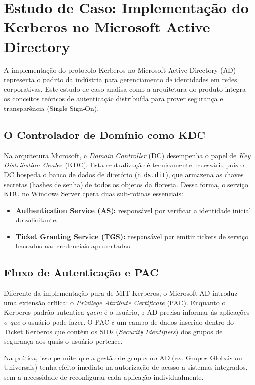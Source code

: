 \section{Estudo de Caso: Implementação do Kerberos no Microsoft Active Directory}
\label{sec:estudo_caso}

A implementação do protocolo Kerberos no Microsoft Active Directory (AD) representa o padrão da indústria para gerenciamento de identidades em redes corporativas. Este estudo de caso analisa como a arquitetura do produto integra os conceitos teóricos de autenticação distribuída para prover segurança e transparência (Single Sign-On).

\subsection{O Controlador de Domínio como KDC}
Na arquitetura Microsoft, o \textit{Domain Controller} (DC) desempenha o papel de \textit{Key Distribution Center} (KDC). Esta centralização é tecnicamente necessária pois o DC hospeda o banco de dados de diretório (\texttt{ntds.dit}), que armazena as chaves secretas (hashes de senha) de todos os objetos da floresta.
Dessa forma, o serviço KDC no Windows Server opera duas sub-rotinas essenciais:
\begin{itemize}
    \item \textbf{Authentication Service (AS):} responsável por verificar a identidade inicial do solicitante.
    \item \textbf{Ticket Granting Service (TGS):} responsável por emitir tickets de serviço baseados nas credenciais apresentadas.
\end{itemize}

\subsection{Fluxo de Autenticação e PAC}
Diferente da implementação pura do MIT Kerberos, o Microsoft AD introduz uma extensão crítica: o \textit{Privilege Attribute Certificate} (PAC).
Enquanto o Kerberos padrão autentica \textit{quem} é o usuário, o AD precisa informar às aplicações \textit{o que} o usuário pode fazer. O PAC é um campo de dados inserido dentro do Ticket Kerberos que contém os SIDs (\textit{Security Identifiers}) dos grupos de segurança aos quais o usuário pertence.

Na prática, isso permite que a gestão de grupos no AD (ex: Grupos Globais ou Universais) tenha efeito imediato na autorização de acesso a sistemas integrados, sem a necessidade de reconfigurar cada aplicação individualmente.


